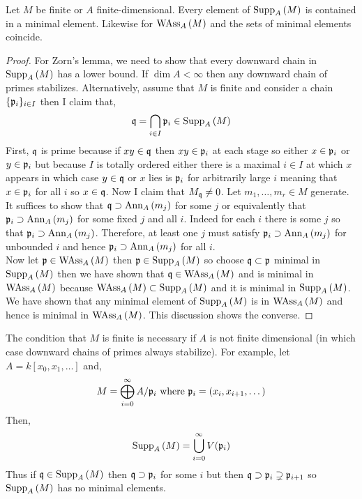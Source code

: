 \documentclass[12pt]{article}
\begin{document}
\begin{prop}
Let $M$ be finite or $A$ finite-dimensional. Every element of $\mathrm{Supp}_{A}\left(M \right)$ is contained in a minimal element. Likewise for $\mathrm{WAss}_{A}\left(M \right)$ and the sets of minimal elements coincide.
\end{prop}

\begin{proof}
For Zorn's lemma, we need to show that every downward chain in $\mathrm{Supp}_{A}\left(M \right)$ has a lower bound. If $\dim{A} < \infty$ then any downward chain of primes stabilizes. Alternatively, assume that $M$ is finite and consider a chain $\{ \mathfrak{p}_i \}_{i \in I}$ then I claim that,
\[ \mathfrak{q} = \bigcap_{i \in I} \mathfrak{p}_i \in \mathrm{Supp}_{A}\left(M \right) \]
First, $\mathfrak{q}$ is prime because if $xy \in \mathfrak{q}$ then $xy \in \mathfrak{p}_i$ at each stage so either $x \in \mathfrak{p}_i$ or $y \in \mathfrak{p}_i$ but because $I$ is totally ordered either there is a maximal $i \in I$ at which $x$ appears in which case $y \in \mathfrak{q}$ or $x$ lies is $\mathfrak{p}_i$ for arbitrarily large $i$ meaning that $x \in \mathfrak{p}_i$ for all $i$ so $x \in \mathfrak{q}$. Now I claim that $M_{\mathfrak{q}} \neq 0$. Let $m_1, \dots, m_r \in M$ generate. It suffices to show that $\mathfrak{q} \supset \mathrm{Ann}_{A}\left(m_j\right)$ for some $j$ or equivalently that $\mathfrak{p}_i \supset \mathrm{Ann}_{A}\left(m_j\right)$ for some fixed $j$ and all $i$. Indeed for each $i$ there is some $j$ so that $\mathfrak{p}_i \supset \mathrm{Ann}_{A}\left(m_j\right)$. Therefore, at least one $j$ must satisfy $\mathfrak{p}_i \supset \mathrm{Ann}_{A}\left(m_j\right)$ for unbounded $i$ and hence $\mathfrak{p}_i \supset \mathrm{Ann}_{A}\left(m_j\right)$ for all $i$. 
\bigskip\\
Now let $\mathfrak{p} \in \mathrm{WAss}_{A}\left(M \right)$ then $\mathfrak{p} \in \mathrm{Supp}_{A}\left(M \right)$ so choose $\mathfrak{q} \subset \mathfrak{p}$ minimal in $\mathrm{Supp}_{A}\left(M \right)$ then we have shown that $\mathfrak{q} \in \mathrm{WAss}_{A}\left(M \right)$ and is minimal in $\mathrm{WAss}_{A}\left(M \right)$ because $\mathrm{WAss}_{A}\left(M \right) \subset \mathrm{Supp}_{A}\left(M \right)$ and it is minimal in $\mathrm{Supp}_{A}\left(M \right)$. We have shown that any minimal element of $\mathrm{Supp}_{A}\left(M \right)$ is in $\mathrm{WAss}_{A}\left(M \right)$ and hence is minimal in $\mathrm{WAss}_{A}\left(M \right)$. This discussion shows the converse. 
\end{proof}

\begin{rmk}
The condition that $M$ is finite is necessary if $A$ is not finite dimensional (in which case downward chains of primes always stabilize). For example, let $A = k[x_0, x_1, \dots]$ and,
\[ M = \bigoplus_{i = 0}^\infty A / \mathfrak{p}_i \text{ where } \mathfrak{p}_i = (x_i, x_{i+1}, \dots) \]
Then,
\[ \mathrm{Supp}_{A}\left(M \right) = \bigcup_{i = 0}^\infty V(\mathfrak{p}_i) \]
Thus if $\mathfrak{q} \in \mathrm{Supp}_{A}\left(M \right)$ then $\mathfrak{q} \supset \mathfrak{p}_i$ for some $i$ but then $\mathfrak{q} \supset \mathfrak{p}_i \supsetneq \mathfrak{p}_{i+1}$ so $\mathrm{Supp}_{A}\left(M \right)$ has no minimal elements.  
\end{rmk}
\end{document}
